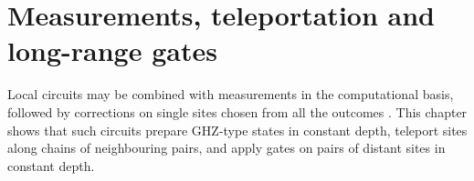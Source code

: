 \chapter{Measurements, teleportation and long-range gates}
\label{ch:circuits_measurements}

Local circuits may be combined with measurements in the computational basis,
followed by corrections on single sites chosen from all the outcomes
\cite{Piroli2021LOCC}. This chapter shows that such circuits prepare GHZ-type
states in constant depth, teleport sites along chains of neighbouring pairs,
and apply gates on pairs of distant sites in constant depth.



